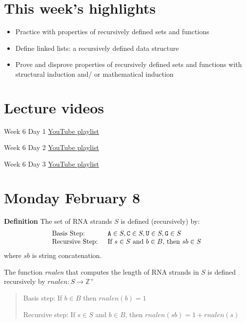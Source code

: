 \documentclass[12pt, oneside]{article}
\begin{document}
\begin{flushright}
\end{flushright}

\section*{This week's highlights}
\begin{itemize}
\item Practice with properties of recursively defined sets and functions
\item Define linked lists: a recursively defined data structure
\item Prove and disprove properties of recursively defined sets and functions with structural induction and/
or mathematical induction
\end{itemize}

\section*{Lecture videos}
Week 6 Day 1
\href{https://youtube.com/playlist?list=PLML4QilACLk5tqLcES_OqUwwxp3yqDlBk}{YouTube playlist}

Week 6 Day 2
\href{https://youtube.com/playlist?list=PLML4QilACLk4TgcwJFIyRw10sZ8JbVcF2}{YouTube playlist}

Week 6 Day 3
\href{https://youtube.com/playlist?list=PLML4QilACLk7GwJnGi4Sn0qqccvz1568Q}{YouTube playlist}

\newpage
\section*{Monday February 8}
{\bf Definition} The set of RNA strands $S$ is defined (recursively) by:
\[
\begin{array}{ll}
\textrm{Basis Step: } & \texttt{A} \in S, \texttt{C} \in S, \texttt{U} \in S, \texttt{G} \in S \\
\textrm{Recursive Step: } & \textrm{If } s \in S\textrm{ and }b \in B \textrm{, then }sb \in S
\end{array}
\]
where $sb$ is string concatenation.

The function \textit{rnalen} that computes the length of RNA strands in $S$ is defined recursively by
$rnalen: S  \to \mathbb{Z}^+$

\vspace{-20pt}

\begin{quote}
Basis step: If $b \in B$ then $rnalen(b)  = 1$

Recursive step: If $s \in S$ and $b \in B$, then $rnalen(sb)  = 1 + rnalen(s)$
\end{quote}
\end{document}
